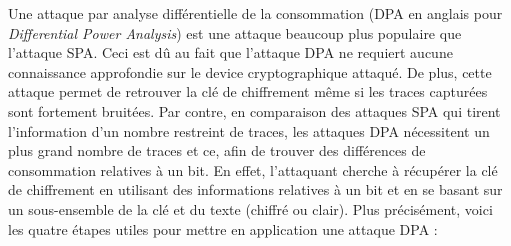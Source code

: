 \documentclass[oneside]{book}
\begin{document}
\vspace{-0.05cm}Une attaque par analyse différentielle de la consommation (DPA en anglais pour \textit{Differential Power Analysis}) \cite{mangard_power_2007} est une attaque beaucoup plus populaire que l'attaque SPA. Ceci est dû au fait que l'attaque DPA ne requiert aucune connaissance approfondie sur le device cryptographique attaqué. De plus, cette attaque permet de retrouver la clé de chiffrement même si les traces capturées sont fortement bruitées. Par contre, en comparaison des attaques SPA qui tirent l'information d'un nombre restreint de traces, les attaques DPA nécessitent un plus grand nombre de traces et ce, afin de trouver des différences de consommation relatives à un bit. En effet, l’attaquant cherche à récupérer la clé de chiffrement en utilisant des informations relatives à un bit et en se basant sur un sous-ensemble de la clé et du texte (chiffré ou clair). Plus précisément, voici les quatre étapes utiles pour mettre en application une attaque DPA : 
\end{document}
